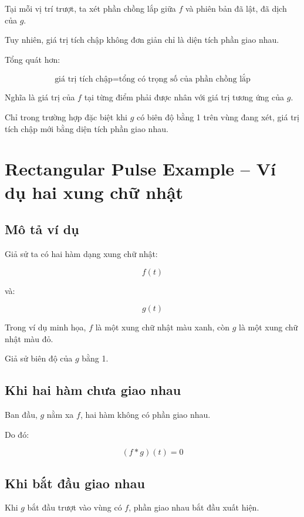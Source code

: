 Tại mỗi vị trí trượt, ta xét phần chồng lắp giữa $f$ và phiên bản đã lật, đã dịch của $g$.

Tuy nhiên, giá trị tích chập không đơn giản chỉ là diện tích phần giao nhau.

Tổng quát hơn:

\[
    \text{giá trị tích chập}
    =
    \text{tổng có trọng số của phần chồng lắp}
\]

Nghĩa là giá trị của $f$ tại từng điểm phải được nhân với giá trị tương ứng của $g$.

\begin{luuy}
Chỉ trong trường hợp đặc biệt khi $g$ có biên độ bằng 1 trên vùng đang xét, giá trị tích chập mới bằng diện tích phần giao nhau.
\end{luuy}

\section{Rectangular Pulse Example -- Ví dụ hai xung chữ nhật}

\subsection{Mô tả ví dụ}

Giả sử ta có hai hàm dạng xung chữ nhật:

\[
    f(t)
\]

và:

\[
    g(t)
\]

Trong ví dụ minh họa, $f$ là một xung chữ nhật màu xanh, còn $g$ là một xung chữ nhật màu đỏ.

Giả sử biên độ của $g$ bằng 1.

\subsection{Khi hai hàm chưa giao nhau}

Ban đầu, $g$ nằm xa $f$, hai hàm không có phần giao nhau.

Do đó:

\[
    (f*g)(t)=0
\]

\subsection{Khi bắt đầu giao nhau}

Khi $g$ bắt đầu trượt vào vùng có $f$, phần giao nhau bắt đầu xuất hiện.


